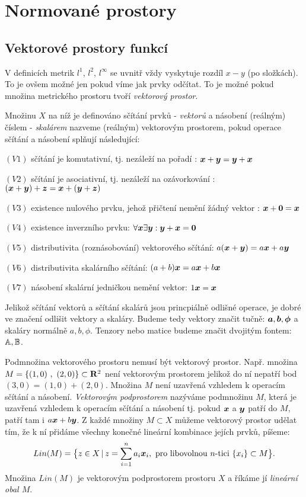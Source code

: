  \chapter{Normované prostory}

 

\section{Vektorové prostory funkcí}
   V definicích metrik $l^1$, $l^2$, $l^\infty$ se uvnitř vždy vyskytuje rozdíl $x-y$ (po složkách). To je ovšem možné jen pokud
   víme jak prvky odčítat. To je možné pokud množina metrického prostoru tvoří {\it vektorový prostor}. 
   \begin{definition}
      Množinu $X$ na níž je definováno sčítání prvků - {\it vektorů} a násobení (reálným) číslem - {\it skalárem} 
      nazveme (reálným) vektorovým prostorem, pokud operace sčítání a násobení splňují následující:
      \begin{description}
        \item $(V1)$ sčítání je komutativní, tj. nezáleží na pořadí : $\mathbf{\boldsymbol{x}}+\mathbf{\boldsymbol{y}} = \mathbf{\boldsymbol{y}}+\mathbf{\boldsymbol{x}}$
        \item $(V2)$ sčítání je asociativní, tj. nezáleží na ozávorkování : $(\mathbf{\boldsymbol{x}}+\mathbf{\boldsymbol{y}})+\mathbf{\boldsymbol{z}} = \mathbf{\boldsymbol{x}}+(\mathbf{\boldsymbol{y}}+\mathbf{\boldsymbol{z}})$
        \item $(V3)$ existence nulového prvku, jehož přičtení nemění žádný vektor : $\mathbf{\boldsymbol{x}} + \mathbf{\boldsymbol{0}} =\mathbf{\boldsymbol{x}}$
        \item $(V4)$ existence inverzního prvku: $\forall \mathbf{\boldsymbol{x}} \exists \mathbf{\boldsymbol{y}}: \mathbf{\boldsymbol{y}}+\mathbf{\boldsymbol{x}}=\mathbf{\boldsymbol{0}}$
        \item $(V5)$ distributivita (roznásobování) vektorového sčítání: $a(\mathbf{\boldsymbol{x}} + \mathbf{\boldsymbol{y}}) = a\mathbf{\boldsymbol{x}} +a\mathbf{\boldsymbol{y}}$
        \item $(V6)$ distributivita skalárního sčítání: $(a+b)\mathbf{\boldsymbol{x}}=a\mathbf{\boldsymbol{x}} + b \mathbf{\boldsymbol{x}}$
        \item $(V7)$ násobení skalární jedničkou nemění vektor: $1 \mathbf{\boldsymbol{x}} = \mathbf{\boldsymbol{x}}$
      \end{description}
   \end{definition}
   Jelikož sčítání vektorů a sčítání skalárů jsou princpiálně odlišné operace, je dobré ve značení odlišit vektory a skaláry. 
   Budeme tedy vektory značit tučně: $\mathbf{\boldsymbol{a}},\mathbf{\boldsymbol{b}}, \mathbf{\boldsymbol{\phi}}$ a skaláry normálně $a,b, \phi$. Tenzory nebo matice budeme značit dvojitým fontem:
   ${\mathbb{A}}, {\mathbb{B}}$.

   Podmnožina vektorového prostoru nemusí být vektorový prostor. Např. množina $M=\{ (1,0)\ ,\ (2,0)\} \subset {\rm\bf R}^2$ není vektorovým
   prostorem jelikož do ní nepatří bod $(3,0)=(1,0)+(2,0)$. Množina $M$ není uzavřená vzhledem k operacím sčítání a násobení. {\it Vektorovým 
   podprostorem} nazýváme podmnožinu $M$, která je uzavřená vzhledem k operacím sčítání a násobení tj. pokud $\mathbf{\boldsymbol{x}}$ a $\mathbf{\boldsymbol{y}}$ patří do $M$, patří
   tam i $a\mathbf{\boldsymbol{x}}+ b\mathbf{\boldsymbol{y}}$. Z každé množiny $M\subset X$ můžeme vektorový prostor udělat tím, že k ní přidáme všechny 
   konečné lineární kombinace jejích prvků, píšeme:
   \[
       Lin(M)=\big\{ z\in X\,|\, z=\sum_{i=1}^n a_i \mathbf{\boldsymbol{x}}_i,\text{ pro libovolnou $n$-tici $\{x_i\} \subset M$} \big\}.
   \]
   Množina $Lin(M)$ je vektorovým podprostorem prostoru $X$ a říkáme jí {\it lineární obal $M$}.

